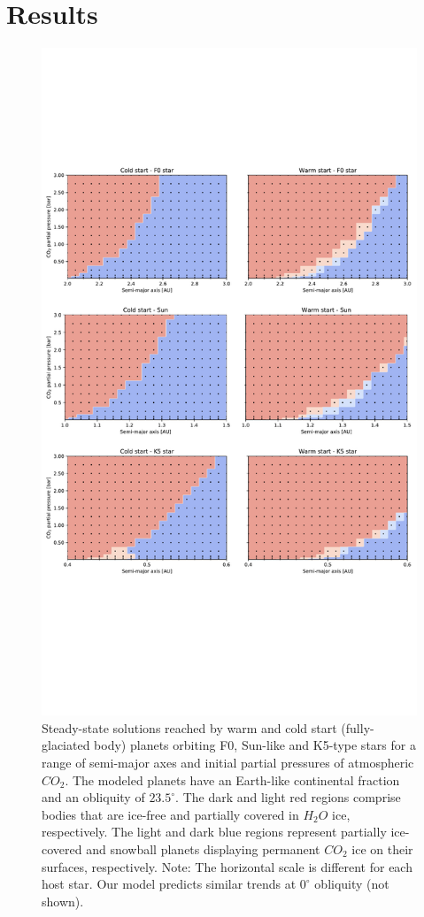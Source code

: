 \documentclass[fleqn,usenatbib]{mnras}
\begin{document}
\section{Results}

\begin{figure}
	\includegraphics[width=\textwidth]{Figures/Steady_state_all.pdf}
    \caption{Steady-state solutions reached by warm and cold start (fully-glaciated body) planets orbiting F0, Sun-like and K5-type stars for a range of semi-major axes and initial partial pressures of atmospheric $CO_{\mathrm{2}}$. The modeled planets have an Earth-like continental fraction and an obliquity of $23.5^{\circ}$. The dark and light red regions comprise bodies that are ice-free and partially covered in $H_{\mathrm{2}}O$ ice, respectively. The light and dark blue regions represent partially ice-covered and snowball planets displaying permanent $CO_{\mathrm{2}}$ ice on their surfaces, respectively. Note: The horizontal scale is different for each host star. Our model predicts similar trends at $0^{\circ}$ obliquity (not shown).} 
    \label{fig:ss_all}
\end{figure}
\end{document}
